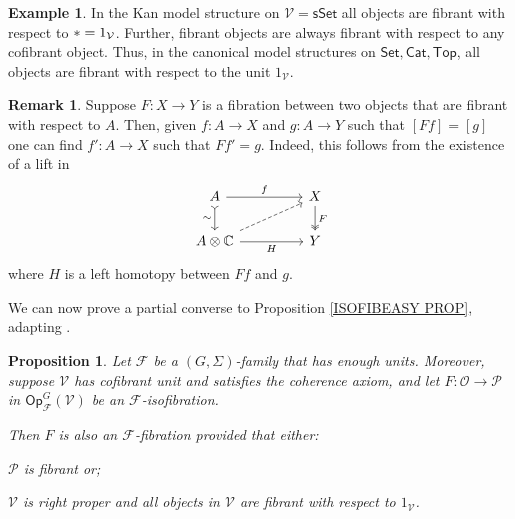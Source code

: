\documentclass[a4paper,10pt
 ,final
]{article}%
\numberwithin{equation}{section}
\numberwithin{figure}{section}
\newtheorem{proposition}[equation]{Proposition}%
\theoremstyle{definition} %
\newtheorem{example}[equation]{Example}%
\newtheorem{remark}[equation]{Remark}%
\newcommand{\Op}{\mathsf{Op}}%
\newcommand{\F}{\ensuremath{\mathcal F}}
\newcommand{\V}{\ensuremath{\mathcal V}}
\renewcommand{\O}{\ensuremath{\mathcal O}}
\renewcommand{\P}{\ensuremath{\mathcal P}}
\newcommand{\1}{\ensuremath{\mathbbm 1}}%
\begin{document}
\begin{example}
	In the Kan model structure on $\V=\mathsf{sSet}$   
	all objects are fibrant with respect to $\** = 1_{\V}$.
	Further, fibrant objects are always fibrant with respect to any cofibrant object.
	Thus, in the canonical model structures on 
	$\mathsf{Set}, \mathsf{Cat}, \mathsf{Top}$,
	all objects are fibrant with respect to the unit $1_{\V}$.
\end{example}


\begin{remark}\label{RELFIBLIFT REM}
	Suppose $F\colon X \to Y$ is a fibration between two objects
	that are fibrant with respect to $A$.
	Then, given 
	$f\colon A \to X$ and $g \colon A \to Y$
	such that
	$[Ff] = [g]$
	one can find 
	$f'\colon A \to X$ such that $Ff' =g$.
	Indeed, this follows from the existence of a 
	lift in 
	\begin{equation}
	\begin{tikzcd}[column sep = 45pt]
	A \ar[>->]{d}[swap]{\sim} \ar{r}{f}
	&
	X \ar[twoheadrightarrow]{d}{F}
	\\
	A \otimes \mathbb{C} \ar{r}[swap]{H} \ar[dashed]{ru}
	&
	Y
	\end{tikzcd}
	\end{equation}
	where $H$ is a left homotopy between $Ff$ and $g$.
\end{remark}


We can now prove a partial converse to Proposition \ref{ISOFIBEASY PROP}, 
adapting \cite[Prop. 2.5]{Ber07b}.


\begin{proposition}
	\label{ISOFIBHARD PROP}
	Let $\F$ be a $(G,\Sigma)$-family that has enough units.
	Moreover, suppose $\V$ has cofibrant unit
	and satisfies the coherence axiom,
	and let $F: \O \to \P$ in $\Op^G_\F(\V)$
	be an $\F$-isofibration.
	
	Then $F$ is also an $\F$-fibration
	provided that either:
	\begin{enumerate*}[label = (\roman*)]
		\item $\P$ is fibrant or;
		\item $\V$ is right proper and
		all objects in $\V$ are fibrant with respect to $1_{\V}$.
	\end{enumerate*}
\end{proposition}
\end{document}
